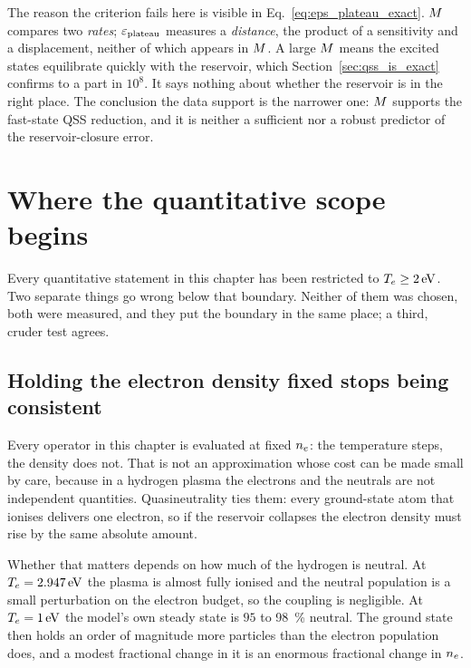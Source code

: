 The reason the criterion fails here is visible in
Eq.~\eqref{eq:eps_plateau_exact}. $M$ compares two \emph{rates}; $\varepsilon_{\mathrm{plateau}}$
measures a \emph{distance}, the product of a sensitivity and a displacement,
neither of which appears in $M$. A large $M$ means the excited
states equilibrate quickly with the reservoir, which
Section~\ref{sec:qss_is_exact} confirms to a part in $10^{8}$. It says nothing
about whether the reservoir is in the right place. The conclusion the data
support is the narrower one: $M$ supports the fast-state QSS reduction,
and it is neither a sufficient nor a robust predictor of the reservoir-closure
error.

\section{Where the quantitative scope begins}
\label{sec:scope}

Every quantitative statement in this chapter has been restricted to
$T_e\ge\SI{2}{\electronvolt}$. Two separate things go wrong below that
boundary. Neither of them was chosen, both were measured, and they put the
boundary in the same place; a third, cruder test agrees.

\subsection{Holding the electron density fixed stops being consistent}
\label{sec:quasineutrality}

Every operator in this chapter is evaluated at fixed $n_e$: the temperature
steps, the density does not. That is not an approximation whose cost can be made
small by care, because in a hydrogen plasma the electrons and the neutrals are
not independent quantities. Quasineutrality ties them: every ground-state atom
that ionises delivers one electron, so if the reservoir collapses the electron
density must rise by the same absolute amount.

Whether that matters depends on how much of the hydrogen is neutral. At
$T_e = \SI{2.947}{\electronvolt}$ the plasma is almost fully ionised and the neutral population
is a small perturbation on the electron budget, so the coupling is negligible.
At $T_e = \SI{1}{\electronvolt}$ the model's own steady state is $95$ to
\SI{98}{\percent} neutral. The ground state then holds an order of magnitude
more particles than the electron population does, and a modest fractional change
in it is an enormous fractional change in $n_e$.

